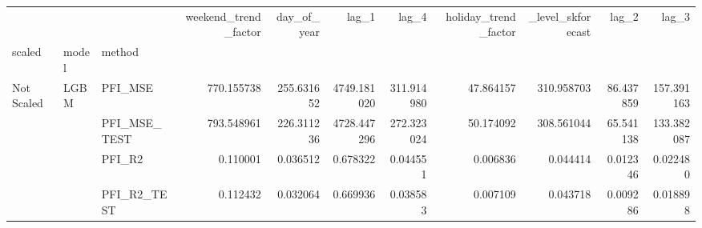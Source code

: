\begin{table}
\centering
\begin{tabular}{lllrrrrrrrr}
\toprule
 &  &  & weekend\_trend\_factor & day\_of\_year & lag\_1 & lag\_4 & holiday\_trend\_factor & \_level\_skforecast & lag\_2 & lag\_3 \\
scaled & model & method &  &  &  &  &  &  &  &  \\
\midrule
\multirow[c]{18}{*}{Not Scaled} & \multirow[c]{9}{*}{LGBM} & PFI\_MSE & {\cellcolor[HTML]{6B8DF0}} \color[HTML]{F1F1F1} 770.155738 & {\cellcolor[HTML]{485FD1}} \color[HTML]{F1F1F1} 255.631652 & {\cellcolor[HTML]{B40426}} \color[HTML]{F1F1F1} 4749.181020 & {\cellcolor[HTML]{4B64D5}} \color[HTML]{F1F1F1} 311.914980 & {\cellcolor[HTML]{3B4CC0}} \color[HTML]{F1F1F1} 47.864157 & {\cellcolor[HTML]{4B64D5}} \color[HTML]{F1F1F1} 310.958703 & {\cellcolor[HTML]{3D50C3}} \color[HTML]{F1F1F1} 86.437859 & {\cellcolor[HTML]{4055C8}} \color[HTML]{F1F1F1} 157.391163 \\
 &  & PFI\_MSE\_TEST & {\cellcolor[HTML]{6C8FF1}} \color[HTML]{F1F1F1} 793.548961 & {\cellcolor[HTML]{455CCE}} \color[HTML]{F1F1F1} 226.311236 & {\cellcolor[HTML]{B40426}} \color[HTML]{F1F1F1} 4728.447296 & {\cellcolor[HTML]{4961D2}} \color[HTML]{F1F1F1} 272.323024 & {\cellcolor[HTML]{3B4CC0}} \color[HTML]{F1F1F1} 50.174092 & {\cellcolor[HTML]{4B64D5}} \color[HTML]{F1F1F1} 308.561044 & {\cellcolor[HTML]{3B4CC0}} \color[HTML]{F1F1F1} 65.541138 & {\cellcolor[HTML]{3F53C6}} \color[HTML]{F1F1F1} 133.382087 \\
 &  & PFI\_R2 & {\cellcolor[HTML]{6B8DF0}} \color[HTML]{F1F1F1} 0.110001 & {\cellcolor[HTML]{485FD1}} \color[HTML]{F1F1F1} 0.036512 & {\cellcolor[HTML]{B40426}} \color[HTML]{F1F1F1} 0.678322 & {\cellcolor[HTML]{4B64D5}} \color[HTML]{F1F1F1} 0.044551 & {\cellcolor[HTML]{3B4CC0}} \color[HTML]{F1F1F1} 0.006836 & {\cellcolor[HTML]{4B64D5}} \color[HTML]{F1F1F1} 0.044414 & {\cellcolor[HTML]{3D50C3}} \color[HTML]{F1F1F1} 0.012346 & {\cellcolor[HTML]{4055C8}} \color[HTML]{F1F1F1} 0.022480 \\
 &  & PFI\_R2\_TEST & {\cellcolor[HTML]{6C8FF1}} \color[HTML]{F1F1F1} 0.112432 & {\cellcolor[HTML]{455CCE}} \color[HTML]{F1F1F1} 0.032064 & {\cellcolor[HTML]{B40426}} \color[HTML]{F1F1F1} 0.669936 & {\cellcolor[HTML]{4961D2}} \color[HTML]{F1F1F1} 0.038583 & {\cellcolor[HTML]{3B4CC0}} \color[HTML]{F1F1F1} 0.007109 & {\cellcolor[HTML]{4B64D5}} \color[HTML]{F1F1F1} 0.043718 & {\cellcolor[HTML]{3B4CC0}} \color[HTML]{F1F1F1} 0.009286 & {\cellcolor[HTML]{3F53C6}} \color[HTML]{F1F1F1} 0.018898 \\

\end{tabular}
\end{table}
